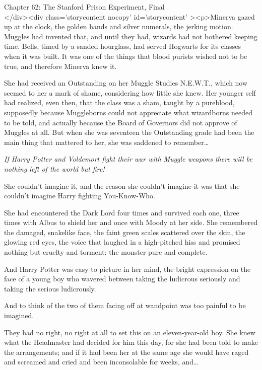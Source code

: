 
Chapter 62: The Stanford Prison Experiment, Final\\
</div><div  class='storycontent nocopy' id='storycontent' ><p>Minerva gazed up 
at the clock, the golden hands and silver numerals, the jerking motion. Muggles 
had invented that, and until they had, wizards had not bothered keeping time. 
Bells, timed by a sanded hourglass, had served Hogwarts for its classes when it 
was built. It was one of the things that blood purists wished not to be true, 
and therefore Minerva knew it.

She had received an Outstanding on her Muggle Studies N.E.W.T., which now 
seemed to her a mark of shame, considering how little she knew. Her younger 
self had realized, even then, that the class was a sham, taught by a pureblood, 
supposedly because Muggleborns could not appreciate what wizardborns needed to 
be told, and actually because the Board of Governors did not approve of Muggles 
at all. But when she was seventeen the Outstanding grade had been the main 
thing that mattered to her, she was saddened to remember{\ldots}

\emph{If Harry Potter and Voldemort fight their war with Muggle weapons there 
will be nothing left of the world but fire!}

She couldn't imagine it, and the reason she couldn't imagine it was that she 
couldn't imagine Harry fighting You-Know-Who.

She had encountered the Dark Lord four times and survived each one, three times 
with Albus to shield her and once with Moody at her side. She remembered the 
damaged, snakelike face, the faint green scales scattered over the skin, the 
glowing red eyes, the voice that laughed in a high-pitched hiss and promised 
nothing but cruelty and torment: the monster pure and complete.

And Harry Potter was easy to picture in her mind, the bright expression on the 
face of a young boy who wavered between taking the ludicrous seriously and 
taking the serious ludicrously.

And to think of the two of them facing off at wandpoint was too painful to be 
imagined.

They had no right, no right at all to set this on an eleven-year-old boy. She 
knew what the Headmaster had decided for him this day, for she had been told to 
make the arrangements; and if it had been her at the same age she would have 
raged and screamed and cried and been inconsolable for weeks, and{\ldots}

